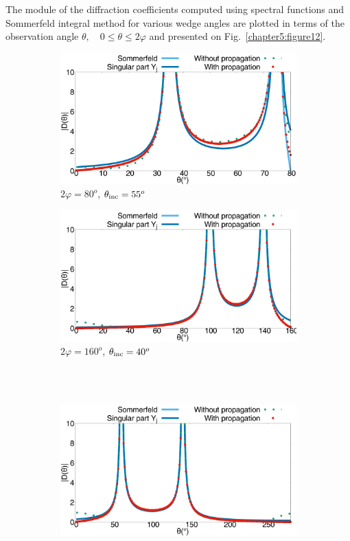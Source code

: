 The module of the diffraction coefficients computed using spectral functions and Sommerfeld integral method for various wedge angles are plotted in terms of the observation angle $\theta, \quad 0\leq \theta\leq 2\varphi$ and presented on Fig.~\ref{chapter5:figure12}. 
\begin{figure}[h!]
\centering
\begin{subfigure}[b]{0.49\textwidth}
        \includegraphics[width=\textwidth]{images/chapter2/Figure8a.pdf}
        \caption{$2\varphi = 80^o$, $\theta_{\rm inc} = 55^o$}
        \label{chapter5:figure12a}
    \end{subfigure}
\begin{subfigure}[b]{0.49\textwidth}
        \includegraphics[width=\textwidth]{images/chapter2/Figure8b.pdf}
        \caption{$2\varphi = 160^o$, $\theta_{\rm inc} = 40^o$}
        \label{chapter5:figure12b}
    \end{subfigure}
\\
~\\
\begin{subfigure}[b]{0.49\textwidth}
        \includegraphics[width=\textwidth]{images/chapter2/Figure8c.pdf}

\end{subfigure}
\end{figure}
